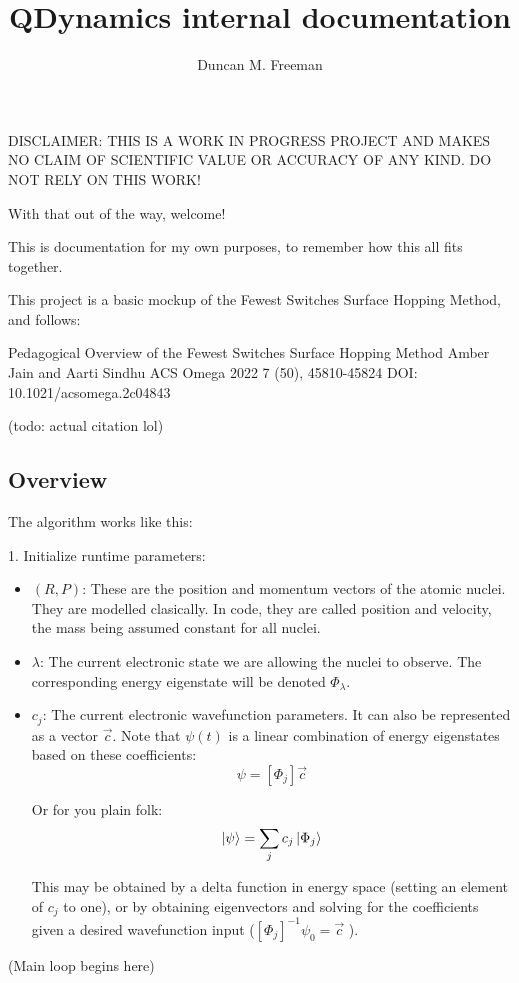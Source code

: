 \documentclass[12pt]{article}
\title{QDynamics internal documentation}
\author{Duncan M. Freeman}
\newcommand{\eigbasis}[0]{[\Phi_j]}
\begin{document}
\maketitle
DISCLAIMER: THIS IS A WORK IN PROGRESS PROJECT AND MAKES NO CLAIM OF SCIENTIFIC VALUE OR ACCURACY OF ANY KIND. DO NOT RELY ON THIS WORK!

With that out of the way, welcome!

This is documentation for my own purposes, to remember how this all fits together.

This project is a basic mockup of the Fewest Switches Surface Hopping
Method, and follows:

Pedagogical Overview of the Fewest Switches Surface Hopping Method
Amber Jain and Aarti Sindhu
ACS Omega 2022 7 (50), 45810-45824
DOI: 10.1021/acsomega.2c04843

(todo: actual citation lol)
\clearpage

\subsection{Overview}
The algorithm works like this:

1. Initialize runtime parameters:
\begin{itemize}
    \item $(R, P)$: These are the position and momentum vectors of the atomic nuclei. They are modelled clasically. In code, they are called position and velocity, the mass being assumed constant for all nuclei.
    \item $\lambda$: The current electronic state we are allowing the nuclei to observe. The corresponding energy eigenstate will be denoted $\Phi_\lambda$.
    \item $c_j$: The current electronic wavefunction parameters. It can also be represented as a vector $\vec{c}$. Note that $\psi(t)$ is a linear combination of energy eigenstates based on these coefficients: 
        \[ \psi = \eigbasis \vec{c} \]

        Or for you plain folk:
        \[ \ket{\psi} = \sum_j c_j \ket{\Phi_j} \]

        This may be obtained by a delta function in energy space (setting an element of $c_j$ to one), or by obtaining eigenvectors and solving for the coefficients given a desired wavefunction input ($\eigbasis^{-1} \psi_0 = \vec{c}$ ).
\end{itemize}

(Main loop begins here)
\end{document}
